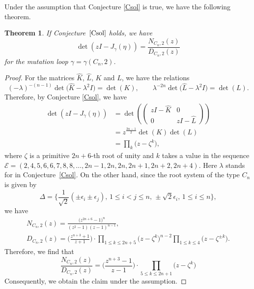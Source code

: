 \documentclass[pdftex]{sigma}
\numberwithin{equation}{section}
\newtheorem{Theorem}{Theorem}[section]
\newcommand{\ep}{\epsilon}
\begin{document}
Under the assumption that Conjecture \ref{Csol} is true, we have the following theorem.
	\begin{Theorem}%
	If Conjecture~$\ref{Csol}$ holds, we have
		\[\det (zI-J_\gamma(\eta))=\frac{N_{C_n,2}(z)}{D_{C_n,2}(z)}\]
	for the mutation loop $\gamma=\gamma(C_n,2)$.
	\end{Theorem}
	\begin{proof}
	For the matrices $\hat{K}$, $\hat{L}$, $K$ and $L$, we have the relations
		\[(-\lambda)^{-(n-1)}\det \bigl(\hat{K}-\lambda^2I\bigr)=\det (K),\qquad\lambda^{-2n}\det \bigl(\hat{L}-\lambda^2I\bigr)=\det (L).\]
	Therefore, by Conjecture \ref{Csol}, we have
		\begin{align*}
		\det (zI-J_\gamma(\eta))&=\det \left(\begin{pmatrix}
			zI-\hat{K}&0\\
			0&zI-\hat{L}\end{pmatrix}\right)\\
		&=z^\frac{3n-1}{2}\det (K)\det (L)\\
		&=\prod_k\bigl(z-\zeta^k\bigr),
		\end{align*}
	where $\zeta$ is a primitive $2n+6$-th root of unity and $k$ takes a value in the sequence $\mathcal{E}=(2,4,5,6,6,7,8,8,\dots,2n-1,2n,2n,2n+1,2n+2,2n+4)$.
	Here $\lambda$ stands for  in Conjecture~\ref{Csol}.
	On the other hand, since the root system of the type $C_n$ is given by
		\[\Delta=\biggl\{\frac{1}{\sqrt{2}}(\pm\ep_i\pm\ep_j),\, 1\leq i<j\leq n,\, \pm\sqrt{2}\ep_i,\, 1\leq i\leq n\biggr\},\]
	we have
		\begin{gather*}
N_{C_n,2}(z)=\frac{\bigl(z^{2n+6}-1\bigr)^n}{(z^2-1)(z-1)^{n-1}},\\
 D_{C_n,2}(z)=\biggl(\frac{z^{n+3}+1}{z+1}\biggr)\cdot\prod_{1\leq k\leq 2n+5}\bigl(z-\zeta^k\bigr)^{n-2}\prod_{1\leq k\leq4}\bigl(z-\zeta^{\pm k}\bigr).
 \end{gather*}
	Therefore, we find that
		\[\frac{N_{C_n,2}(z)}{D_{C_n,2}(z)}=\biggl(\frac{z^{n+3}-1}{z-1}\biggr)\cdot\prod_{5\leq k\leq 2n+1}\bigl(z-\zeta^k\bigr)\]
	Consequently, we obtain the claim under the assumption.
	\end{proof}
\end{document}
